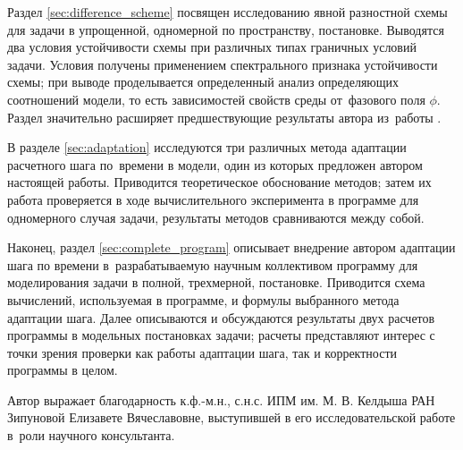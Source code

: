 Раздел \ref{sec:difference_scheme} посвящен исследованию явной разностной схемы для задачи в упрощенной, одномерной по пространству, постановке. Выводятся два условия устойчивости схемы при различных типах граничных условий задачи. Условия получены применением спектрального признака устойчивости схемы; при выводе проделывается определенный анализ определяющих соотношений модели, то есть зависимостей свойств среды от~фазового поля $\phi$. Раздел значительно расширяет предшествующие результаты автора из~работы \cite{ponomarev_stability}.

В разделе \ref{sec:adaptation} исследуются три различных метода адаптации расчетного шага по~времени в модели, один из которых предложен автором настоящей работы. Приводится теоретическое обоснование методов; затем их работа проверяется в ходе вычислительного эксперимента в программе для одномерного случая задачи, результаты методов сравниваются между собой.

Наконец, раздел \ref{sec:complete_program} описывает внедрение автором адаптации шага по времени в~разрабатываемую научным коллективом программу для моделирования задачи в полной, трехмерной, постановке. Приводится схема вычислений, используемая в программе, и формулы выбранного метода адаптации шага. Далее описываются и обсуждаются результаты двух расчетов программы в модельных постановках задачи; расчеты представляют интерес с точки зрения проверки как работы адаптации шага, так и корректности программы в целом.

Автор выражает благодарность к.ф.-м.н., с.н.с. ИПМ им. М. В. Келдыша РАН Зипуновой Елизавете Вячеславовне, выступившей в его исследовательской работе в~роли научного консультанта.